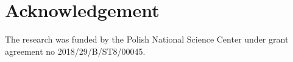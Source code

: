 \documentclass[preprint,12pt]{elsarticle}
\begin{document}
\section*{Acknowledgement}
The research was funded by the Polish National Science Center under grant agreement no 2018/29/B/ST8/00045. 


    
	{}
\end{document}
